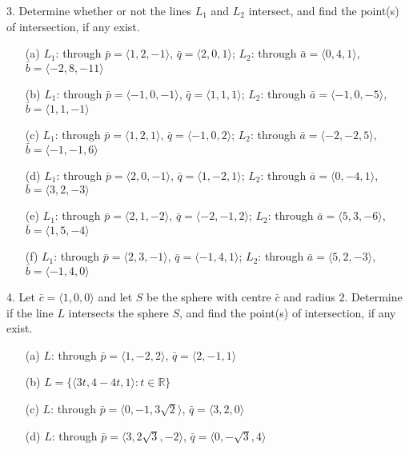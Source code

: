 \begin{exercisebox}
3. Determine whether or not the lines $L_1$ and $L_2$ intersect, and find the point(s) of intersection, if any exist.
\begin{itemize}
    \item[(a)] $L_1$: through $\bar{p} = \langle 1, 2, -1 \rangle$, $\bar{q} = \langle 2, 0, 1 \rangle$; 
              $L_2$: through $\bar{a} = \langle 0, 4, 1 \rangle$, $\bar{b} = \langle -2, 8, -11 \rangle$
    \item[(b)] $L_1$: through $\bar{p} = \langle -1, 0, -1 \rangle$, $\bar{q} = \langle 1, 1, 1 \rangle$; 
              $L_2$: through $\bar{a} = \langle -1, 0, -5 \rangle$, $\bar{b} = \langle 1, 1, -1 \rangle$
    \item[(c)] $L_1$: through $\bar{p} = \langle 1, 2, 1 \rangle$, $\bar{q} = \langle -1, 0, 2 \rangle$; 
              $L_2$: through $\bar{a} = \langle -2, -2, 5 \rangle$, $\bar{b} = \langle -1, -1, 6 \rangle$
    \item[(d)] $L_1$: through $\bar{p} = \langle 2, 0, -1 \rangle$, $\bar{q} = \langle 1, -2, 1 \rangle$; 
              $L_2$: through $\bar{a} = \langle 0, -4, 1 \rangle$, $\bar{b} = \langle 3, 2, -3 \rangle$
    \item[(e)] $L_1$: through $\bar{p} = \langle 2, 1, -2 \rangle$, $\bar{q} = \langle -2, -1, 2 \rangle$; 
              $L_2$: through $\bar{a} = \langle 5, 3, -6 \rangle$, $\bar{b} = \langle 1, 5, -4 \rangle$
    \item[(f)] $L_1$: through $\bar{p} = \langle 2, 3, -1 \rangle$, $\bar{q} = \langle -1, 4, 1 \rangle$; 
              $L_2$: through $\bar{a} = \langle 5, 2, -3 \rangle$, $\bar{b} = \langle -1, 4, 0 \rangle$
\end{itemize}

4. Let $\bar{c} = \langle 1, 0, 0 \rangle$ and let $S$ be the sphere with centre $\bar{c}$ and radius $2$. Determine if the line $L$ intersects the sphere $S$, and find the point(s) of intersection, if any exist.
\begin{itemize}
    \item[(a)] $L$: through $\bar{p} = \langle 1, -2, 2 \rangle$, $\bar{q} = \langle 2, -1, 1 \rangle$
    \item[(b)] $L = \{\langle 3t, 4 - 4t, 1 \rangle : t \in \mathbb{R} \}$
    \item[(c)] $L$: through $\bar{p} = \langle 0, -1, 3\sqrt{2} \rangle$, $\bar{q} = \langle 3, 2, 0 \rangle$
    \item[(d)] $L$: through $\bar{p} = \langle 3, 2\sqrt{3}, -2 \rangle$, $\bar{q} = \langle 0, -\sqrt{3}, 4 \rangle$
\end{itemize}

\end{exercisebox}


